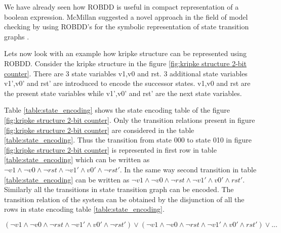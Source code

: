 We have already seen how ROBDD is useful in compact representation of a boolean expression. McMillan suggested a novel approach in the field of model checking by using ROBDD's for the symbolic representation of state transition graphs \cite{Burch 1990}\cite{McMillan 1993}.

Lets now look with an example how kripke structure can be represented using ROBDD. Consider the kripke structure in the figure \ref{fig:kripke structure 2-bit counter}. There are 3 state variables v1,v0 and rst. 3 additional state variables v1',v0' and rst' are introduced to encode the successor states. v1,v0 and rst are the present state variables while v1',v0' and rst' are the next state variables.

Table \ref{table:state_encoding} shows the state encoding table of the figure \ref{fig:kripke structure 2-bit counter}. Only the transition relations present in figure \ref{fig:kripke structure 2-bit counter} are considered in the table \ref{table:state_encoding}. Thus the transition from state 000 to state 010 in figure \ref{fig:kripke structure 2-bit counter} is represented in first row in table \ref{table:state_encoding} which can be written as $\neg v1 \land \neg v0 \land \neg rst \land \neg v1' \land v0' \land \neg rst'$. In the same way second transition in table \ref{table:state_encoding} can be written as $\neg v1 \land \neg v0 \land \neg rst \land \neg v1' \land v0' \land rst'$. Similarly all the transitions in state transition graph can be encoded. The transition relation of the system can be obtained by the disjunction of all the rows in state encoding table \ref{table:state_encoding}.

$(\neg v1 \land \neg v0 \land \neg rst \land \neg v1' \land v0' \land \neg rst') \lor (\neg v1 \land \neg v0 \land \neg rst \land \neg v1' \land v0' \land rst') \lor ...$


